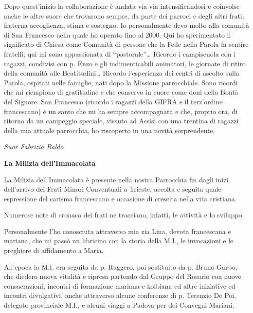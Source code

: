 Dopo quest’inizio la collaborazione è andata via via intensificandosi e coinvolse anche le 
altre suore che trovarono sempre, da parte dei parroci e degli altri frati, fraterna accoglienza, stima e 
sostegno. Io personalmente devo molto alla comunità di San Francesco nella quale ho operato fino 
al 2000. Qui ho sperimentato il significato di Chiesa come Comunità di persone che la Fede nella 
Parola fa sentire fratelli; qui mi sono appassionata di “pastorale”… Ricordo i campiscuola con i 
ragazzi,  condivisi con p. Enzo e gli indimenticabili animatori, le giornate di ritiro della comunità 
alle Beatitudini… Ricordo l’esperienza dei centri di ascolto sulla Parola, ospitati nelle famiglie, nati 
dopo la Missione parrocchiale. Sono ricordi che mi riempiono di gratitudine e che conservo in cuore 
come doni della Bontà del Signore. San Francesco (ricordo i  ragazzi della GIFRA e il terz’ordine 
francescano) è un santo che mi ha sempre accompagnata e che, proprio ora, di ritorno da un 
campeggio speciale, vissuto ad Assisi con una trentina di ragazzi della mia attuale parrocchia, ho 
riscoperto in una novità sorprendente.
\begin{flushright}
\textit{Suor Fabrizia Baldo}
\end{flushright}
\bigskip
{}
{}
\begin{center}
\textbf{\Large La Milizia dell'Immacolata}
\end{center}
\bigbreak
La Milizia dell’Immacolata è presente nella nostra Parrocchia fin dagli inizi dell’arrivo dei Frati
Minori Conventuali a Trieste, accolta e seguita quale espressione del carisma francescano e 
occasione di crescita nella vita cristiana.

Numerose note di cronaca dei frati ne tracciano, infatti, le attività e lo sviluppo.

Personalmente l’ho conosciuta attraverso mia zia Lina, devota francescana e mariana, che mi passò 
un libricino con la storia della M.I., le invocazioni e le preghiere di affidamento a Maria.

All’epoca la M.I. era seguita da p. Ruggero, poi sostituito da p. Bruno Garbo, che diedero nuova 
vitalità e ripresa partendo dal Gruppo del Rosario con nuove consacrazioni, incontri di formazione 
mariana e kolbiana ed altre iniziative ed incontri divulgativi, anche attraverso alcune conferenze di 
p. Terenzio De Poi, delegato provinciale M.I., e alcuni viaggi a Padova per dei Convegni Mariani.

